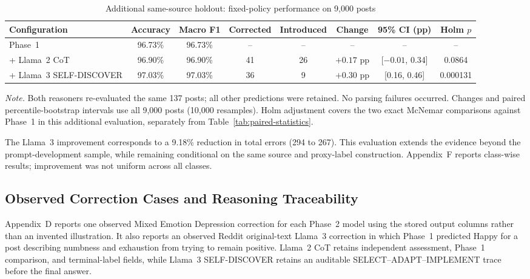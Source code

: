 \documentclass{ieeeaccess}
\begin{document}
\begin{table}[t]
\centering
\caption{Additional same-source holdout: fixed-policy performance on 9,000 posts}
\label{tab:additional-holdout}
\footnotesize
\setlength{\tabcolsep}{4pt}
\renewcommand{\arraystretch}{1.16}
\begin{tabularx}{\textwidth}{@{}Y c c c c c c c@{}}
\toprule
Configuration & Accuracy & Macro F1 & Corrected & Introduced & Change & 95\% CI (pp) & Holm $p$ \\
\midrule
Phase~1 & 96.73\% & 96.73\% & -- & -- & -- & -- & -- \\
+ Llama~2 CoT & 96.90\% & 96.90\% & 41 & 26 & $+0.17$ pp & [$-0.01$, 0.34] & 0.0864 \\
+ Llama~3 SELF-DISCOVER & 97.03\% & 97.03\% & 36 & 9 & $+0.30$ pp & [0.16, 0.46] & 0.000131 \\
\bottomrule
\end{tabularx}
\vspace{2pt}
\parbox{\textwidth}{\footnotesize\textit{Note.} Both reasoners re-evaluated the same 137 posts; all other predictions were retained. No parsing failures occurred. Changes and paired percentile-bootstrap intervals use all 9,000 posts (10,000 resamples). Holm adjustment covers the two exact McNemar comparisons against Phase~1 in this additional evaluation, separately from Table~\ref{tab:paired-statistics}.}
\end{table}

The Llama~3 improvement corresponds to a 9.18\% reduction in total errors (294 to 267). This evaluation extends the evidence beyond the prompt-development sample, while remaining conditional on the same source and proxy-label construction. Appendix~F reports class-wise results; improvement was not uniform across all classes.

\subsection{Observed Correction Cases and Reasoning Traceability}

Appendix~D reports one observed Mixed Emotion Depression correction for each Phase~2 model using the stored output columns rather than an invented illustration. It also reports an observed Reddit original-text Llama~3 correction in which Phase~1 predicted Happy for a post describing numbness and exhaustion from trying to remain positive. Llama~2 CoT retains independent assessment, Phase~1 comparison, and terminal-label fields, while Llama~3 SELF-DISCOVER retains an auditable SELECT--ADAPT--IMPLEMENT trace before the final answer.
\end{document}
